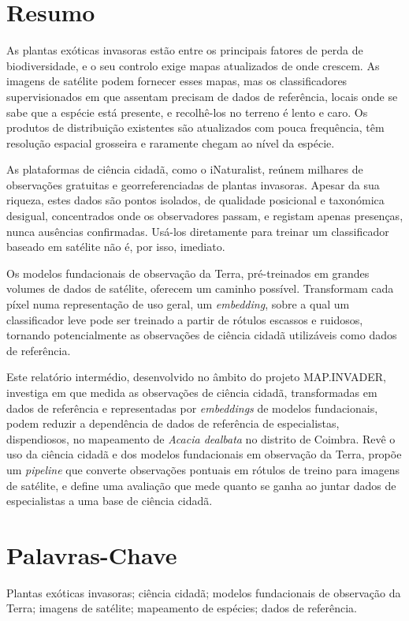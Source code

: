 \thispagestyle{plain}

\section*{Resumo}
\label{sec:resumo}

As plantas exóticas invasoras estão entre os principais fatores de
perda de biodiversidade, e o seu controlo exige mapas atualizados de
onde crescem. As imagens de satélite podem fornecer esses mapas, mas
os classificadores supervisionados em que assentam precisam de dados
de referência, locais onde se sabe que a espécie está presente, e
recolhê-los no terreno é lento e caro. Os produtos de distribuição
existentes são atualizados com pouca frequência, têm resolução
espacial grosseira e raramente chegam ao nível da espécie.

As plataformas de ciência cidadã, como o iNaturalist, reúnem milhares
de observações gratuitas e georreferenciadas de plantas invasoras.
Apesar da sua riqueza, estes dados são pontos isolados, de qualidade
posicional e taxonómica desigual, concentrados onde os observadores
passam, e registam apenas presenças, nunca ausências confirmadas.
Usá-los diretamente para treinar um classificador baseado em satélite
não é, por isso, imediato.

Os modelos fundacionais de observação da Terra, pré-treinados em
grandes volumes de dados de satélite, oferecem um caminho possível.
Transformam cada píxel numa representação de uso geral, um
\emph{embedding}, sobre a qual um classificador leve pode ser treinado
a partir de rótulos escassos e ruidosos, tornando potencialmente as
observações de ciência cidadã utilizáveis como dados de referência.

Este relatório intermédio, desenvolvido no âmbito do projeto
MAP.INVADER, investiga em que medida as observações de ciência cidadã,
transformadas em dados de referência e representadas por
\emph{embeddings} de modelos fundacionais, podem reduzir a dependência
de dados de referência de especialistas, dispendiosos, no mapeamento
de \emph{Acacia dealbata} no distrito de Coimbra. Revê o uso da ciência
cidadã e dos modelos fundacionais em observação da Terra, propõe um
\emph{pipeline} que converte observações pontuais em rótulos de treino
para imagens de satélite, e define uma avaliação que mede quanto se
ganha ao juntar dados de especialistas a uma base de ciência cidadã.

\section*{Palavras-Chave}
\label{sec:palavras}

Plantas exóticas invasoras; ciência cidadã; modelos fundacionais de
observação da Terra; imagens de satélite; mapeamento de espécies;
dados de referência.
